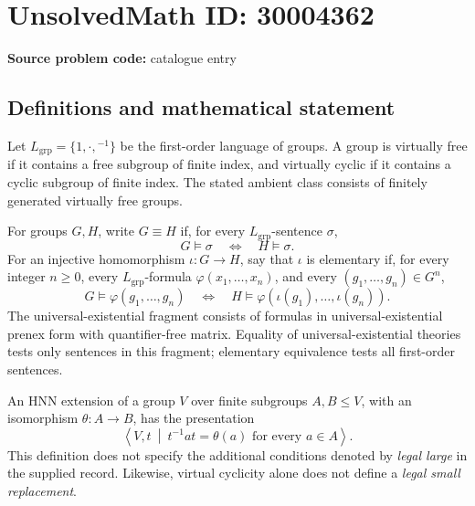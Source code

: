 \documentclass[11pt]{article}
\begin{document}
\section*{UnsolvedMath ID: 30004362}
\textbf{Source problem code:} catalogue entry
\subsection{Definitions and mathematical statement}
Let \(L_{\mathrm{grp}}=\{1,\cdot,{}^{-1}\}\) be the first-order language of groups. A group is virtually free if it contains a free subgroup of finite index, and virtually cyclic if it contains a cyclic subgroup of finite index. The stated ambient class consists of finitely generated virtually free groups.

For groups \(G,H\), write \(G\equiv H\) if, for every \(L_{\mathrm{grp}}\)-sentence \(\sigma\),
\[
G\models\sigma\quad\Longleftrightarrow\quad H\models\sigma.
\]
For an injective homomorphism \(\iota:G\to H\), say that \(\iota\) is elementary if, for every integer \(n\geq 0\), every \(L_{\mathrm{grp}}\)-formula \(\varphi(x_1,\ldots,x_n)\), and every \((g_1,\ldots,g_n)\in G^n\),
\[
G\models\varphi(g_1,\ldots,g_n)
\quad\Longleftrightarrow\quad
H\models\varphi(\iota(g_1),\ldots,\iota(g_n)).
\]
The universal-existential fragment consists of formulas in universal-existential prenex form with quantifier-free matrix. Equality of universal-existential theories tests only sentences in this fragment; elementary equivalence tests all first-order sentences.

An HNN extension of a group \(V\) over finite subgroups \(A,B\leq V\), with an isomorphism \(\theta:A\to B\), has the presentation
\[
\left\langle V,t\ \middle|\ t^{-1}at=\theta(a)\text{ for every }a\in A\right\rangle.
\]
This definition does not specify the additional conditions denoted by \emph{legal large} in the supplied record. Likewise, virtual cyclicity alone does not define a \emph{legal small replacement}.
\end{document}
